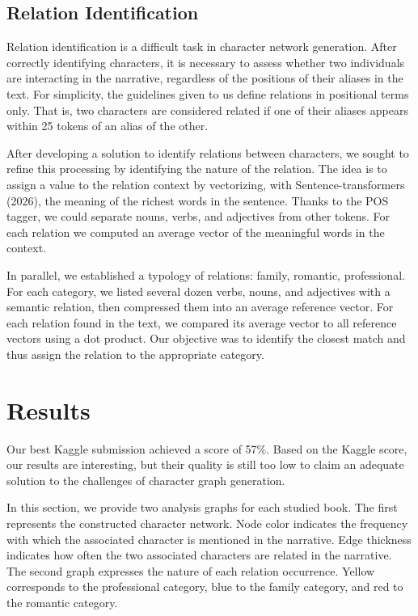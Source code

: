 \documentclass[a4paper]{article}
\begin{document}
\FloatBarrier

\subsection{Relation Identification}

Relation identification is a difficult task in character network generation. After correctly identifying characters, it is necessary to assess whether two individuals are interacting in the narrative, regardless of the positions of their aliases in the text. For simplicity, the guidelines given to us define relations in positional terms only. That is, two characters are considered related if one of their aliases appears within 25 tokens of an alias of the other.

After developing a solution to identify relations between characters, we sought to refine this processing by identifying the nature of the relation. The idea is to assign a value to the relation context by vectorizing, with Sentence-transformers (2026), the meaning of the richest words in the sentence. Thanks to the POS tagger, we could separate nouns, verbs, and adjectives from other tokens. For each relation we computed an average vector of the meaningful words in the context.

In parallel, we established a typology of relations: family, romantic, professional. For each category, we listed several dozen verbs, nouns, and adjectives with a semantic relation, then compressed them into an average reference vector. For each relation found in the text, we compared its average vector to all reference vectors using a dot product. Our objective was to identify the closest match and thus assign the relation to the appropriate category.

\section{Results}

Our best Kaggle submission achieved a score of 57\%. Based on the Kaggle score, our results are interesting, but their quality is still too low to claim an adequate solution to the challenges of character graph generation.

In this section, we provide two analysis graphs for each studied book. The first represents the constructed character network. Node color indicates the frequency with which the associated character is mentioned in the narrative. Edge thickness indicates how often the two associated characters are related in the narrative. The second graph expresses the nature of each relation occurrence. Yellow corresponds to the professional category, blue to the family category, and red to the romantic category.
\end{document}
